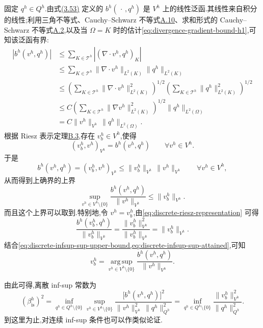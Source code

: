 \begin{note}[上确界的取值]\label{note:discrete-infsup-supremum}
固定 $q^h\in Q^h$.由式\hyperref[eq:discrete-bilinear-form-b]{(3.53)} 定义的 $b^h(\,\cdot\,,q^h)$ 是 $V^h$ 上的线性泛函.其线性来自积分的线性;利用三角不等式、Cauchy--Schwarz 不等式\hyperref[eq:appendix-a-10]{A.10}、求和形式的 Cauchy--Schwarz 不等式\hyperref[eq:appendix-a-2]{A.2},以及当 $\Omega=K$ 时的估计\cref{eq:divergence-gradient-bound-h1},可知该泛函有界:
\[
\begin{aligned}
  |b^h(v^h,q^h)|
   &\le \sum_{K\in\mathcal{T}^h}
        \left|(\nabla\cdot v^h,q^h)_K\right|\\
   &\le \sum_{K\in\mathcal{T}^h}
        \|\nabla\cdot v^h\|_{L^2(K)}
        \|q^h\|_{L^2(K)}\\
   &\le
       \left(\sum_{K\in\mathcal{T}^h}
         \|\nabla\cdot v^h\|_{L^2(K)}^2\right)^{1/2}
       \left(\sum_{K\in\mathcal{T}^h}
         \|q^h\|_{L^2(K)}^2\right)^{1/2}\\
   &\le C
       \left(\sum_{K\in\mathcal{T}^h}
         \|\nabla v^h\|_{L^2(K)}^2\right)^{1/2}
       \|q^h\|_{L^2(\Omega)}\\
   &=C\|v^h\|_{V^h}\,\|q^h\|_{L^2(\Omega)}.
\end{aligned}
\]
根据 Riesz 表示定理\hyperref[thm:appendix-b-3]{B.3},存在 $v_b^h\in V^h$,使得
\begin{equation}\label{eq:discrete-riesz-representation}
  (v_b^h,v^h)_{V^h}=b^h(v^h,q^h)
  \qquad\forall v^h\in V^h.
\end{equation}
于是
\[
  b^h(v^h,q^h)
   =(v_b^h,v^h)_{V^h}
   \le \|v_b^h\|_{V^h}\,\|v^h\|_{V^h}
   \qquad\forall v^h\in V^h,
\]
从而得到上确界的上界
\begin{equation}\label{eq:discrete-infsup-sup-upper-bound}
  \sup_{v^h\in V^h\setminus\{0\}}
      \frac{b^h(v^h,q^h)}{\|v^h\|_{V^h}}
  \le \|v_b^h\|_{V^h}.
\end{equation}
而且这个上界可以取到.特别地,令 $v^h=v_b^h$,由\cref{eq:discrete-riesz-representation} 可得
\begin{equation}\label{eq:discrete-infsup-sup-attained}
  \frac{b^h(v_b^h,q^h)}{\|v_b^h\|_{V^h}}
  =\frac{\|v_b^h\|_{V^h}^2}{\|v_b^h\|_{V^h}}
  =\|v_b^h\|_{V^h}.
\end{equation}
结合\cref{eq:discrete-infsup-sup-upper-bound,eq:discrete-infsup-sup-attained},可知
\[
  v_b^h
   =\operatorname*{arg\,sup}_{v^h\in V^h\setminus\{0\}}
       \frac{b^h(v^h,q^h)}{\|v^h\|_{V^h}}.
\]

由此可得,离散 inf-sup 常数为
\begin{equation}\label{eq:discrete-infsup-constant-riesz}
  \left(\beta_{\mathrm{is}}^h\right)^2
   =\inf_{q^h\in Q^h\setminus\{0\}}
      \sup_{v^h\in V^h\setminus\{0\}}
      \frac{\bigl[b^h(v^h,q^h)\bigr]^2}
           {\|v^h\|_{V^h}^2\,\|q^h\|_{Q^h}^2}
   =\inf_{q^h\in Q^h\setminus\{0\}}
      \frac{\|v_b^h\|_{V^h}^2}{\|q^h\|_{Q^h}^2}.
\end{equation}
到这里为止,对连续 inf-sup 条件也可以作类似论证.
\end{note}

